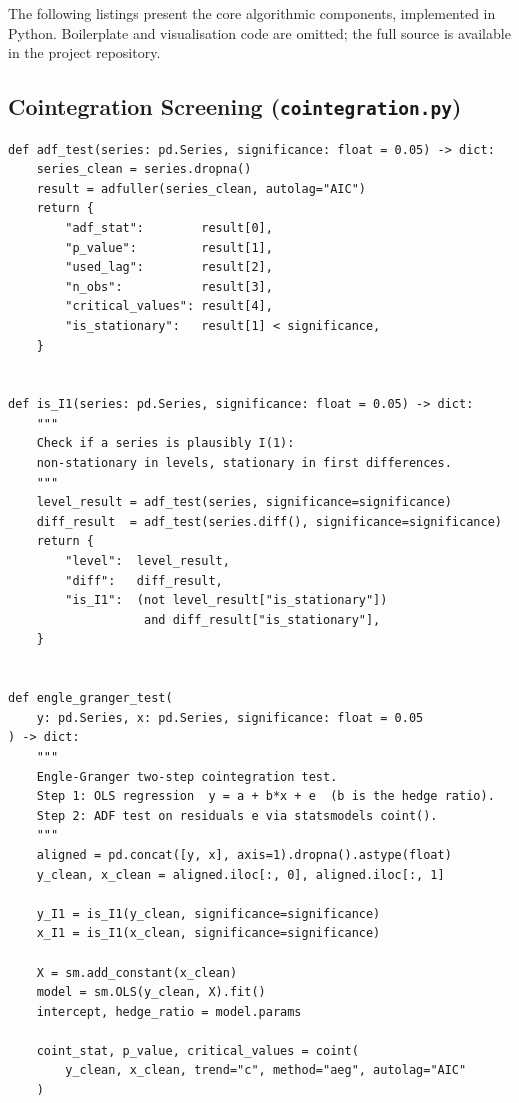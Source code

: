 \documentclass[a4paper]{report}
\begin{document}
The following listings present the core algorithmic components, implemented in Python. Boilerplate and visualisation code are omitted; the full source is available in the project repository.
\subsection{Cointegration Screening (\texttt{cointegration.py})}

\begin{Verbatim}[fontsize=\footnotesize, baselinestretch=0.85]
def adf_test(series: pd.Series, significance: float = 0.05) -> dict:
    series_clean = series.dropna()
    result = adfuller(series_clean, autolag="AIC")
    return {
        "adf_stat":        result[0],
        "p_value":         result[1],
        "used_lag":        result[2],
        "n_obs":           result[3],
        "critical_values": result[4],
        "is_stationary":   result[1] < significance,
    }


def is_I1(series: pd.Series, significance: float = 0.05) -> dict:
    """
    Check if a series is plausibly I(1):
    non-stationary in levels, stationary in first differences.
    """
    level_result = adf_test(series, significance=significance)
    diff_result  = adf_test(series.diff(), significance=significance)
    return {
        "level":  level_result,
        "diff":   diff_result,
        "is_I1":  (not level_result["is_stationary"])
                   and diff_result["is_stationary"],
    }


def engle_granger_test(
    y: pd.Series, x: pd.Series, significance: float = 0.05
) -> dict:
    """
    Engle-Granger two-step cointegration test.
    Step 1: OLS regression  y = a + b*x + e  (b is the hedge ratio).
    Step 2: ADF test on residuals e via statsmodels coint().
    """
    aligned = pd.concat([y, x], axis=1).dropna().astype(float)
    y_clean, x_clean = aligned.iloc[:, 0], aligned.iloc[:, 1]

    y_I1 = is_I1(y_clean, significance=significance)
    x_I1 = is_I1(x_clean, significance=significance)

    X = sm.add_constant(x_clean)
    model = sm.OLS(y_clean, X).fit()
    intercept, hedge_ratio = model.params

    coint_stat, p_value, critical_values = coint(
        y_clean, x_clean, trend="c", method="aeg", autolag="AIC"
    )


\end{Verbatim}
\end{document}
